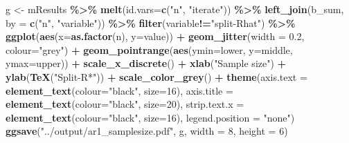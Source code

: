 \documentclass[
]{article}
\newenvironment{Shaded}{\begin{snugshade}}{\end{snugshade}}
\newcommand{\AttributeTok}[1]{\textcolor[rgb]{0.13,0.29,0.53}{#1}}
\newcommand{\DecValTok}[1]{\textcolor[rgb]{0.00,0.00,0.81}{#1}}
\newcommand{\FloatTok}[1]{\textcolor[rgb]{0.00,0.00,0.81}{#1}}
\newcommand{\FunctionTok}[1]{\textcolor[rgb]{0.13,0.29,0.53}{\textbf{#1}}}
\newcommand{\NormalTok}[1]{#1}
\newcommand{\OtherTok}[1]{\textcolor[rgb]{0.56,0.35,0.01}{#1}}
\newcommand{\SpecialCharTok}[1]{\textcolor[rgb]{0.81,0.36,0.00}{\textbf{#1}}}
\newcommand{\StringTok}[1]{\textcolor[rgb]{0.31,0.60,0.02}{#1}}
\begin{document}
\begin{Shaded}
\begin{Highlighting}[]
\NormalTok{g }\OtherTok{\textless{}{-}}\NormalTok{ mResults }\SpecialCharTok{\%\textgreater{}\%} 
  \FunctionTok{melt}\NormalTok{(}\AttributeTok{id.vars=}\FunctionTok{c}\NormalTok{(}\StringTok{"n"}\NormalTok{, }\StringTok{"iterate"}\NormalTok{)) }\SpecialCharTok{\%\textgreater{}\%} 
  \FunctionTok{left\_join}\NormalTok{(b\_sum, }\AttributeTok{by =} \FunctionTok{c}\NormalTok{(}\StringTok{"n"}\NormalTok{, }\StringTok{"variable"}\NormalTok{)) }\SpecialCharTok{\%\textgreater{}\%} 
  \FunctionTok{filter}\NormalTok{(variable}\SpecialCharTok{!=}\StringTok{"split{-}Rhat"}\NormalTok{) }\SpecialCharTok{\%\textgreater{}\%} 
  \FunctionTok{ggplot}\NormalTok{(}\FunctionTok{aes}\NormalTok{(}\AttributeTok{x=}\FunctionTok{as.factor}\NormalTok{(n), }\AttributeTok{y=}\NormalTok{value)) }\SpecialCharTok{+}
  \FunctionTok{geom\_jitter}\NormalTok{(}\AttributeTok{width =} \FloatTok{0.2}\NormalTok{, }\AttributeTok{colour=}\StringTok{"grey"}\NormalTok{) }\SpecialCharTok{+}
  \FunctionTok{geom\_pointrange}\NormalTok{(}\FunctionTok{aes}\NormalTok{(}\AttributeTok{ymin=}\NormalTok{lower, }\AttributeTok{y=}\NormalTok{middle, }\AttributeTok{ymax=}\NormalTok{upper)) }\SpecialCharTok{+}
  \FunctionTok{scale\_x\_discrete}\NormalTok{() }\SpecialCharTok{+}
  \FunctionTok{xlab}\NormalTok{(}\StringTok{"Sample size"}\NormalTok{) }\SpecialCharTok{+}
  \FunctionTok{ylab}\NormalTok{(}\FunctionTok{TeX}\NormalTok{(}\StringTok{"Split{-}R*"}\NormalTok{)) }\SpecialCharTok{+}
  \FunctionTok{scale\_color\_grey}\NormalTok{() }\SpecialCharTok{+}
  \FunctionTok{theme}\NormalTok{(}\AttributeTok{axis.text =} \FunctionTok{element\_text}\NormalTok{(}\AttributeTok{colour=}\StringTok{"black"}\NormalTok{, }\AttributeTok{size=}\DecValTok{16}\NormalTok{),}
        \AttributeTok{axis.title =} \FunctionTok{element\_text}\NormalTok{(}\AttributeTok{colour=}\StringTok{"black"}\NormalTok{, }\AttributeTok{size=}\DecValTok{20}\NormalTok{),}
        \AttributeTok{strip.text.x =} \FunctionTok{element\_text}\NormalTok{(}\AttributeTok{colour=}\StringTok{"black"}\NormalTok{, }\AttributeTok{size=}\DecValTok{16}\NormalTok{),}
        \AttributeTok{legend.position =} \StringTok{"none"}\NormalTok{)}
\FunctionTok{ggsave}\NormalTok{(}\StringTok{"../output/ar1\_samplesize.pdf"}\NormalTok{, g, }\AttributeTok{width =} \DecValTok{8}\NormalTok{, }\AttributeTok{height =} \DecValTok{6}\NormalTok{)}
\end{Highlighting}
\end{Shaded}
\end{document}
